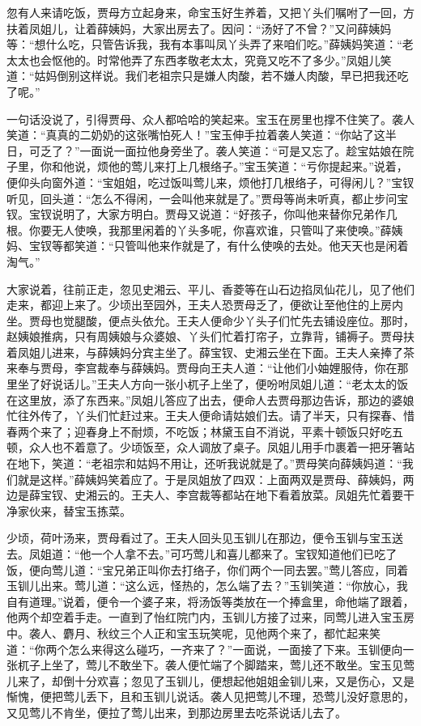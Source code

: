 \documentclass[12pt,oneside]{book}
\begin{document}
忽有人来请吃饭，贾母方立起身来，命宝玉好生养着，又把丫头们嘱咐了一回，方扶着凤姐儿，让着薛姨妈，大家出房去了。因问：“汤好了不曾？”又问薛姨妈等：“想什么吃，只管告诉我，我有本事叫凤丫头弄了来咱们吃。”薛姨妈笑道：“老太太也会怄他的。时常他弄了东西孝敬老太太，究竟又吃不了多少。”凤姐儿笑道：“姑妈倒别这样说。我们老祖宗只是嫌人肉酸，若不嫌人肉酸，早已把我还吃了呢。”

一句话没说了，引得贾母、众人都哈哈的笑起来。宝玉在房里也撑不住笑了。袭人笑道：“真真的二奶奶的这张嘴怕死人！”宝玉伸手拉着袭人笑道：“你站了这半日，可乏了？”一面说一面拉他身旁坐了。袭人笑道：“可是又忘了。趁宝姑娘在院子里，你和他说，烦他的莺儿来打上几根络子。”宝玉笑道：“亏你提起来。”说着，便仰头向窗外道：“宝姐姐，吃过饭叫莺儿来，烦他打几根络子，可得闲儿？”宝钗听见，回头道：“怎么不得闲，一会叫他来就是了。”贾母等尚未听真，都止步问宝钗。宝钗说明了，大家方明白。贾母又说道：“好孩子，你叫他来替你兄弟作几根。你要无人使唤，我那里闲着的丫头多呢，你喜欢谁，只管叫了来使唤。”薛姨妈、宝钗等都笑道：“只管叫他来作就是了，有什么使唤的去处。他天天也是闲着淘气。”

大家说着，往前正走，忽见史湘云、平儿、香菱等在山石边掐凤仙花儿，见了他们走来，都迎上来了。少顷出至园外，王夫人恐贾母乏了，便欲让至他住的上房内坐。贾母也觉腿酸，便点头依允。王夫人便命少丫头子们忙先去铺设座位。那时，赵姨娘推病，只有周姨娘与众婆娘、丫头们忙着打帘子，立靠背，铺褥子。贾母扶着凤姐儿进来，与薛姨妈分宾主坐了。薛宝钗、史湘云坐在下面。王夫人亲捧了茶来奉与贾母，李宫裁奉与薛姨妈。贾母向王夫人道：“让他们小妯娌服侍，你在那里坐了好说话儿。”王夫人方向一张小杌子上坐了，便吩咐凤姐儿道：“老太太的饭在这里放，添了东西来。”凤姐儿答应了出去，便命人去贾母那边告诉，那边的婆娘忙往外传了，丫头们忙赶过来。王夫人便命请姑娘们去。请了半天，只有探春、惜春两个来了；迎春身上不耐烦，不吃饭；林黛玉自不消说，平素十顿饭只好吃五顿，众人也不着意了。少顷饭至，众人调放了桌子。凤姐儿用手巾裹着一把牙箸站在地下，笑道：“老祖宗和姑妈不用让，还听我说就是了。”贾母笑向薛姨妈道：“我们就是这样。”薛姨妈笑着应了。于是凤姐放了四双：上面两双是贾母、薛姨妈，两边是薛宝钗、史湘云的。王夫人、李宫裁等都站在地下看着放菜。凤姐先忙着要干净家伙来，替宝玉拣菜。

少顷，荷叶汤来，贾母看过了。王夫人回头见玉钏儿在那边，便令玉钏与宝玉送去。凤姐道：“他一个人拿不去。”可巧莺儿和喜儿都来了。宝钗知道他们已吃了饭，便向莺儿道：“宝兄弟正叫你去打络子，你们两个一同去罢。”莺儿答应，同着玉钏儿出来。莺儿道：“这么远，怪热的，怎么端了去？”玉钏笑道：“你放心，我自有道理。”说着，便令一个婆子来，将汤饭等类放在一个捧盒里，命他端了跟着，他两个却空着手走。一直到了怡红院门内，玉钏儿方接了过来，同莺儿进入宝玉房中。袭人、麝月、秋纹三个人正和宝玉玩笑呢，见他两个来了，都忙起来笑道：“你两个怎么来得这么碰巧，一齐来了？”一面说，一面接了下来。玉钏便向一张杌子上坐了，莺儿不敢坐下。袭人便忙端了个脚踏来，莺儿还不敢坐。宝玉见莺儿来了，却倒十分欢喜；忽见了玉钏儿，便想起他姐姐金钏儿来，又是伤心，又是惭愧，便把莺儿丢下，且和玉钏儿说话。袭人见把莺儿不理，恐莺儿没好意思的，又见莺儿不肯坐，便拉了莺儿出来，到那边房里去吃茶说话儿去了。
\end{document}
